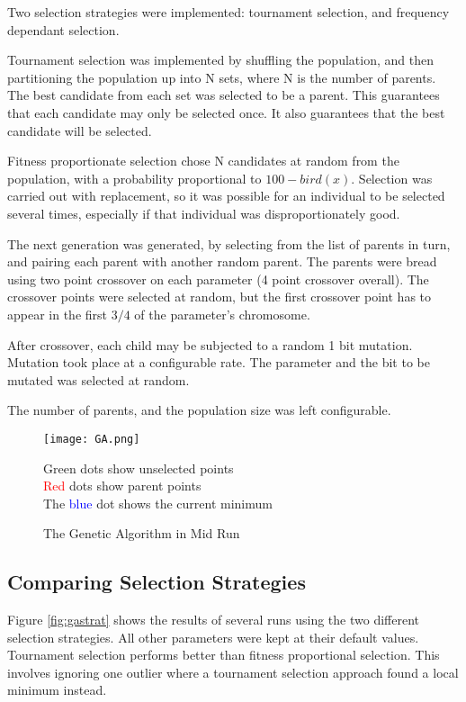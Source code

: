 \documentclass[a4paper,12pt]{article}
\begin{document}
Two selection strategies were implemented: tournament selection, and frequency dependant selection. 

Tournament selection was implemented by shuffling the population, and then partitioning the population up into N sets, where N is the number of parents. The best candidate from each set was selected to be a parent.
This guarantees that each candidate may only be selected once. 
It also guarantees that the best candidate will be selected.

Fitness proportionate selection chose N candidates at random from the population, with a probability proportional to $100 - bird(x)$. 
Selection was carried out with replacement, so it was possible for an individual to be selected several times, especially if that individual was disproportionately good. 

The next generation was generated, by selecting from the list of parents in turn, and pairing each parent with another random parent. The parents were bread using two point crossover on each parameter (4 point crossover overall).
The crossover points were selected at random, but the first crossover point has to appear in the first $3/4$ of the parameter's chromosome.

After crossover, each child may be subjected to a random 1 bit mutation.
Mutation took place at a configurable rate. The parameter and the bit to be mutated was selected at random.

The number of parents, and the population size was left configurable. 

\begin{figure}[H]
 \centering
 \texttt{[image: GA.png]}
 \caption{The Genetic Algorithm in Mid Run}
 \textcolor{OliveGreen}{Green} dots show unselected points\\
 \textcolor{red}{Red} dots show parent points\\
 The \textcolor{blue}{blue} dot shows the current minimum  
\end{figure}

\subsection{Comparing Selection Strategies}
Figure \ref{fig:gastrat} shows the results of several runs using the two different selection strategies.
All other parameters were kept at their default values.
Tournament selection performs better than fitness proportional selection.
This involves ignoring one outlier where a tournament selection approach found a local minimum instead.
\end{document}

